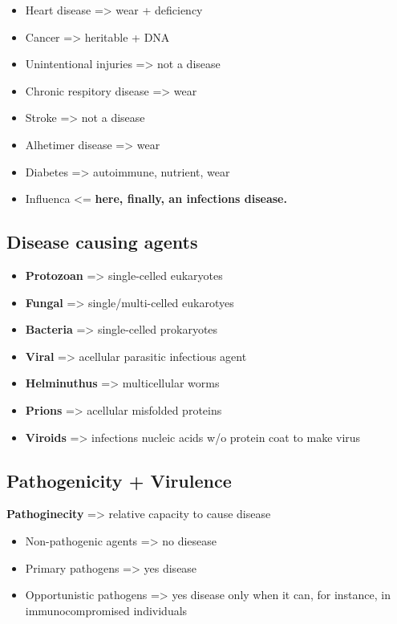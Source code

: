 \documentclass[letterpaper]{article}
\begin{document}
\begin{itemize}
\item Heart disease => wear + deficiency
\item Cancer => heritable + DNA
\item Unintentional injuries => not a disease
\item Chronic respitory disease => wear
\item Stroke => not a disease
\item Alhetimer disease => wear
\item Diabetes => autoimmune, nutrient, wear
\item Influenca <= \textbf{here, finally, an infections disease.}
\end{itemize}

\subsection{Disease causing agents}
\label{sec:orgbef1b58}
\begin{itemize}
\item \textbf{Protozoan} => single-celled eukaryotes
\item \textbf{Fungal} => single/multi-celled eukarotyes
\item \textbf{Bacteria} => single-celled prokaryotes
\item \textbf{Viral} => acellular parasitic infectious agent
\item \textbf{Helminuthus} => multicellular worms
\item \textbf{Prions} => acellular misfolded proteins
\item \textbf{Viroids} => infections nucleic acids w/o protein coat to make virus
\end{itemize}

\subsection{Pathogenicity + Virulence}
\label{sec:org93ecd83}
\textbf{Pathoginecity} => relative capacity to cause disease

\begin{itemize}
\item Non-pathogenic agents => no diesease
\item Primary pathogens => yes disease
\item Opportunistic pathogens => yes disease only when it can, for instance,
in immunocompromised individuals
\end{itemize}
\end{document}
